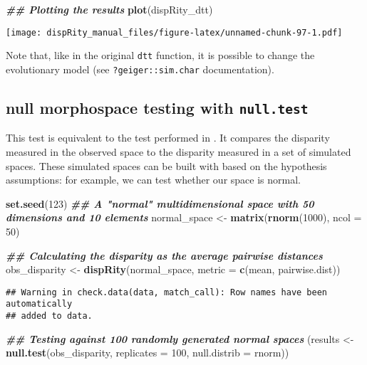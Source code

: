 \documentclass[
]{book}
\newenvironment{Shaded}{\begin{snugshade}}{\end{snugshade}}
\newcommand{\AttributeTok}[1]{\textcolor[rgb]{0.13,0.29,0.53}{#1}}
\newcommand{\DecValTok}[1]{\textcolor[rgb]{0.00,0.00,0.81}{#1}}
\newcommand{\DocumentationTok}[1]{\textcolor[rgb]{0.56,0.35,0.01}{\textbf{\textit{#1}}}}
\newcommand{\FunctionTok}[1]{\textcolor[rgb]{0.13,0.29,0.53}{\textbf{#1}}}
\newcommand{\NormalTok}[1]{#1}
\newcommand{\OtherTok}[1]{\textcolor[rgb]{0.56,0.35,0.01}{#1}}
\begin{document}
\begin{Shaded}
\begin{Highlighting}[]
\DocumentationTok{\#\# Plotting the results}
\FunctionTok{plot}\NormalTok{(dispRity\_dtt)}
\end{Highlighting}
\end{Shaded}

\texttt{[image: dispRity\_manual\_files/figure-latex/unnamed-chunk-97-1.pdf]}

Note that, like in the original \texttt{dtt} function, it is possible to change the evolutionary model (see \texttt{?geiger::sim.char} documentation).

\hypertarget{null-test}{%
\subsection{\texorpdfstring{null morphospace testing with \texttt{null.test}}{null morphospace testing with null.test}}\label{null-test}}

This test is equivalent to the test performed in \citet{diaz2016global}.
It compares the disparity measured in the observed space to the disparity measured in a set of simulated spaces.
These simulated spaces can be built with based on the hypothesis assumptions: for example, we can test whether our space is normal.

\begin{Shaded}
\begin{Highlighting}[]
\FunctionTok{set.seed}\NormalTok{(}\DecValTok{123}\NormalTok{)}
\DocumentationTok{\#\# A "normal" multidimensional space with 50 dimensions and 10 elements}
\NormalTok{normal\_space }\OtherTok{\textless{}{-}} \FunctionTok{matrix}\NormalTok{(}\FunctionTok{rnorm}\NormalTok{(}\DecValTok{1000}\NormalTok{), }\AttributeTok{ncol =} \DecValTok{50}\NormalTok{)}

\DocumentationTok{\#\# Calculating the disparity as the average pairwise distances}
\NormalTok{obs\_disparity }\OtherTok{\textless{}{-}} \FunctionTok{dispRity}\NormalTok{(normal\_space,}
                          \AttributeTok{metric =} \FunctionTok{c}\NormalTok{(mean, pairwise.dist))}
\end{Highlighting}
\end{Shaded}

\begin{verbatim}
## Warning in check.data(data, match_call): Row names have been automatically
## added to data.
\end{verbatim}

\begin{Shaded}
\begin{Highlighting}[]
\DocumentationTok{\#\# Testing against 100 randomly generated normal spaces}
\NormalTok{(results }\OtherTok{\textless{}{-}} \FunctionTok{null.test}\NormalTok{(obs\_disparity, }\AttributeTok{replicates =} \DecValTok{100}\NormalTok{,}
                      \AttributeTok{null.distrib =}\NormalTok{ rnorm))}
\end{Highlighting}
\end{Shaded}
\end{document}
